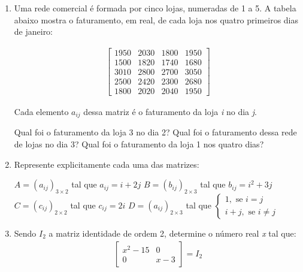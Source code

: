 \begin{enumerate}[label*=\protect\fbox{\arabic{enumi}}]
	\item {
	      Uma rede comercial é formada por cinco lojas, numeradas de 1 a 5. A tabela abaixo mostra o faturamento, em real, de
	      cada loja nos quatro primeiros dias de janeiro:

	      \begin{equation*}
		      \begin{split}
			      \begin{bmatrix}
				      1950 & 2030 & 1800 & 1950 \\
				      1500 & 1820 & 1740 & 1680 \\
				      3010 & 2800 & 2700 & 3050 \\
				      2500 & 2420 & 2300 & 2680 \\
				      1800 & 2020 & 2040 & 1950
			      \end{bmatrix}
		      \end{split}
	      \end{equation*}

	      Cada elemento $a_{ij}$ dessa matriz é o faturamento da loja \textit{i} no dia \textit{j}.

	      \begin{tasks}
		      \task Qual foi o faturamento da loja 3 no dia 2?
		      \task Qual foi o faturamento dessa rede de lojas no dia 3?
		      \task Qual foi o faturamento da loja 1 nos quatro dias?
	      \end{tasks}
	      }
	\item {
	      Represente explicitamente cada uma das matrizes:
	      \begin{tasks}
		      \task $A = (a_{ij})_{3 \times 2}$ tal que $a_{ij} = i + 2j$
		      \task $B = (b_{ij})_{2 \times 3}$ tal que $b_{ij} = i^2 + 3j$
		      \task $C = (c_{ij})_{2 \times 2}$ tal que $c_{ij} = 2i$
		      \task $D = (a_{ij})_{2 \times 3}$ tal que $\begin{cases} 1, \text{ se } i = j \\ i + j, \text{ se } i \neq j \end{cases}$
	      \end{tasks}
	      }

	\item {
	      Sendo $I_2$ a matriz identidade de ordem 2, determine o número real \textit{x} tal que:
	      \begin{equation*}
		      \begin{split}
			      \begin{bmatrix}
				      x^2 - 15 & 0     \\
				      0        & x - 3
			      \end{bmatrix} = I_2
		      \end{split}
	      \end{equation*}
	      }


\end{enumerate}
